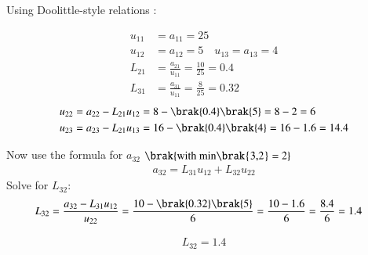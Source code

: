 \documentclass[journal]{IEEEtran}
\begin{document}
Using Doolittle-style relations :

\begin{align}
u_{11} &= a_{11} = 25\\
u_{12} &= a_{12} = 5\quad u_{13}=a_{13}=4\\
L_{21} &= \frac{a_{21}}{u_{11}}=\frac{10}{25}=0.4\\
L_{31} &= \frac{a_{31}}{u_{11}}=\frac{8}{25}=0.32
\end{align}
\begin{align}
u_{22} &= a_{22} - L_{21}u_{12} = 8 - \brak{0.4}\brak{5} = 8 - 2 = 6\\
u_{23} &= a_{23} - L_{21}u_{13} = 16 - \brak{0.4}\brak{4} = 16 - 1.6 = 14.4
\end{align}

Now use the formula for $a_{32}$ $\brak{\text{with   min\brak{3,2} = 2}}$
\begin{align}
a_{32} = L_{31}u_{12} + L_{32}u_{22}
\end{align}
Solve for $L_{32}$:
\begin{align}
L_{32} &= \frac{a_{32} - L_{31}u_{12}}{u_{22}}
= \frac{10 - \brak{0.32}\brak{5}}{6}
= \frac{10 - 1.6}{6}
= \frac{8.4}{6}
= 1.4
\end{align}

\begin{align}
L_{32} = 1.4
\end{align}
\end{document}
